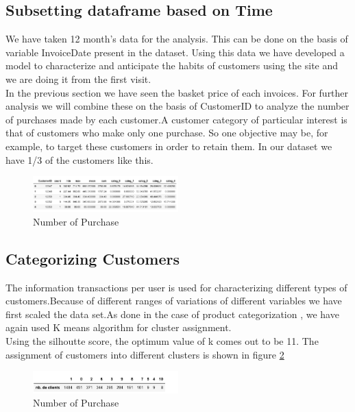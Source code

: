 \subsection{Subsetting dataframe based on Time}


We have taken 12 month's data for the analysis. This can be done on the basis of variable InvoiceDate present in the dataset. Using this data we have developed a model to characterize and anticipate the habits of customers using the site and we are doing it from the first visit.\\

In the previous section we have seen the basket price of each invoices. For further analysis we will combine these on the basis of CustomerID to analyze the number of purchases made by each customer.A customer category of particular interest is that of customers who make only one purchase. So one objective may be, for example, to target these customers in order to retain them. In our dataset we have 1/3 of the customers like this.

\begin{figure}[h]
\caption{Number of Purchase}
\label{4.2}
\centering
\includegraphics[width=0.5\textwidth]{images/4_2.PNG}
\end{figure}


\subsection{Categorizing Customers}

The information transactions per user is used for characterizing different types of customers.Because of different ranges of variations of different variables we have first scaled the data set.As done in the case of product categorization , we have again used K means algorithm for cluster assignment.\\

Using the silhoutte score, the optimum value of k comes out to be 11. The assignment of customers into different clusters is shown in figure \ref{4.3}

\begin{figure}[h]
\caption{Number of Purchase}
\label{4.3}
\centering
\includegraphics[width=0.5\textwidth]{images/4_3.PNG}
\end{figure}

